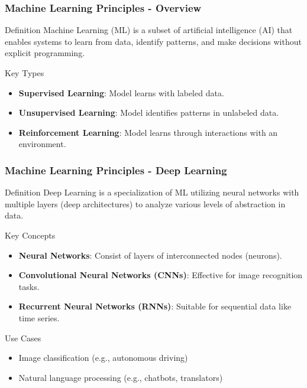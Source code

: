 \documentclass[aspectratio=169]{beamer}
\begin{document}
\begin{frame}[fragile]
    \frametitle{Machine Learning Principles - Overview}
    \begin{block}{Definition}
        Machine Learning (ML) is a subset of artificial intelligence (AI) that enables systems to learn from data, identify patterns, and make decisions without explicit programming.
    \end{block}

    \begin{block}{Key Types}
        \begin{itemize}
            \item \textbf{Supervised Learning}: Model learns with labeled data.
            \item \textbf{Unsupervised Learning}: Model identifies patterns in unlabeled data.
            \item \textbf{Reinforcement Learning}: Model learns through interactions with an environment.
        \end{itemize}
    \end{block}
\end{frame}

\begin{frame}[fragile]
    \frametitle{Machine Learning Principles - Deep Learning}
    \begin{block}{Definition}
        Deep Learning is a specialization of ML utilizing neural networks with multiple layers (deep architectures) to analyze various levels of abstraction in data.
    \end{block}

    \begin{block}{Key Concepts}
        \begin{itemize}
            \item \textbf{Neural Networks}: Consist of layers of interconnected nodes (neurons).
            \item \textbf{Convolutional Neural Networks (CNNs)}: Effective for image recognition tasks.
            \item \textbf{Recurrent Neural Networks (RNNs)}: Suitable for sequential data like time series.
        \end{itemize}
    \end{block}
    
    \begin{block}{Use Cases}
        \begin{itemize}
            \item Image classification (e.g., autonomous driving)
            \item Natural language processing (e.g., chatbots, translators)
        \end{itemize}
    \end{block}
\end{frame}
\end{document}
